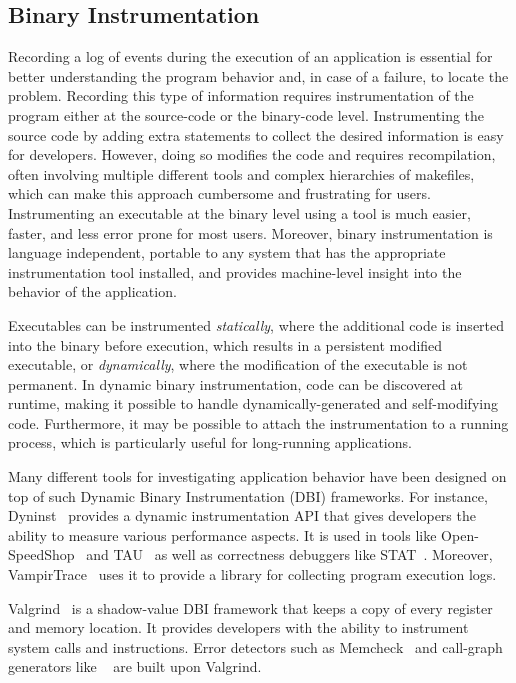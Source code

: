 \subsection{Binary Instrumentation}
Recording a log of events during the execution of an application is essential for better understanding the program behavior and, in case of a failure, to locate the problem. Recording this type of information requires instrumentation of the program either at the source-code or the binary-code level. Instrumenting the source code by adding extra statements to collect the desired information is easy for developers. However, doing so modifies the code and requires recompilation, often involving multiple different tools and complex hierarchies of makefiles, which can make this approach cumbersome and frustrating for users. Instrumenting an executable at the binary level using a tool is much easier, faster, and less error prone for most users. Moreover, binary instrumentation is language independent, portable to any system that has the appropriate instrumentation tool installed, and provides machine-level insight into the behavior of the application.

Executables can be instrumented \textit{statically}, where the additional code is inserted into the binary before execution, which results in a persistent modified executable, or \textit{dynamically}, where the modification of the executable is not permanent. In dynamic binary instrumentation, code can be discovered at runtime, making it possible to handle dynamically-generated and self-modifying code. Furthermore, it may be possible to attach the instrumentation to a running process, which is particularly useful for long-running applications.

Many different tools for investigating application behavior have been designed on top of such Dynamic Binary Instrumentation (DBI) frameworks. For instance, Dyninst~\cite{dyninst} provides a dynamic instrumentation API that gives developers the ability to measure various performance aspects. It is used in tools like Open-SpeedShop~\cite{openss} and TAU~\cite{tau} as well as correctness debuggers like STAT~\cite{stat}. Moreover, VampirTrace~\cite{vampirt} uses it to provide a library for collecting program execution logs. 

Valgrind~\cite{valgrind} is a shadow-value DBI framework that keeps a copy of every register and memory location. It provides developers with the ability to instrument system calls and instructions. Error detectors such as Memcheck~\cite{memcheck} and call-graph generators like \callgrind~\cite{callgrind} are built upon Valgrind.

